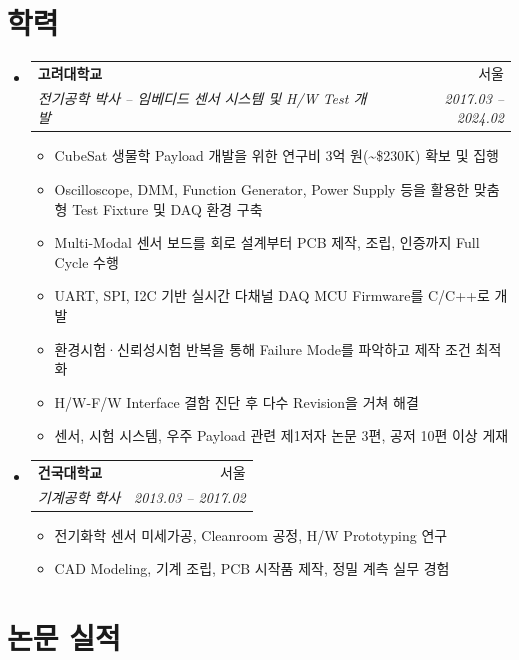 \documentclass[letterpaper,11pt]{article}
\makeatletter
\newcommand{\resumeItem}[1]{
  \item\small{#1 \vspace{-1pt}}
}
\newcommand{\resumeSubheading}[4]{
  \vspace{2pt}\item
    \begin{tabular*}{0.97\textwidth}[t]{l@{\extracolsep{\fill}}r}
      \textbf{#1} & #2 \\
      \textit{\small#3} & \textit{\small #4} \\
    \end{tabular*}\vspace{-3pt}
}
\newcommand{\resumeSubHeadingListStart}{\begin{itemize}[leftmargin=*]}
\newcommand{\resumeSubHeadingListEnd}{\end{itemize}}
\newcommand{\resumeItemListStart}{\begin{itemize}}
\newcommand{\resumeItemListEnd}{\end{itemize}\vspace{-2pt}}
\makeatother
\begin{document}
\section{학력}
  \resumeSubHeadingListStart
    \resumeSubheading
      {고려대학교}{서울}
      {전기공학 박사 -- 임베디드 센서 시스템 및 H/W Test 개발}{2017.03 -- 2024.02}
      \resumeItemListStart
        \resumeItem{CubeSat 생물학 Payload 개발을 위한 연구비 3억 원(\textasciitilde\$230K) 확보 및 집행}
        \resumeItem{Oscilloscope, DMM, Function Generator, Power Supply 등을 활용한 맞춤형 Test Fixture 및 DAQ 환경 구축}
        \resumeItem{Multi-Modal 센서 보드를 회로 설계부터 PCB 제작, 조립, 인증까지 Full Cycle 수행}
        \resumeItem{UART, SPI, I2C 기반 실시간 다채널 DAQ MCU Firmware를 C/C++로 개발}
        \resumeItem{환경시험·신뢰성시험 반복을 통해 Failure Mode를 파악하고 제작 조건 최적화}
        \resumeItem{H/W-F/W Interface 결함 진단 후 다수 Revision을 거쳐 해결}
        \resumeItem{센서, 시험 시스템, 우주 Payload 관련 제1저자 논문 3편, 공저 10편 이상 게재}
      \resumeItemListEnd
    \resumeSubheading
      {건국대학교}{서울}
      {기계공학 학사}{2013.03 -- 2017.02}
      \resumeItemListStart
        \resumeItem{전기화학 센서 미세가공, Cleanroom 공정, H/W Prototyping 연구}
        \resumeItem{CAD Modeling, 기계 조립, PCB 시작품 제작, 정밀 계측 실무 경험}
      \resumeItemListEnd
  \resumeSubHeadingListEnd

\section{논문 실적}
\end{document}
